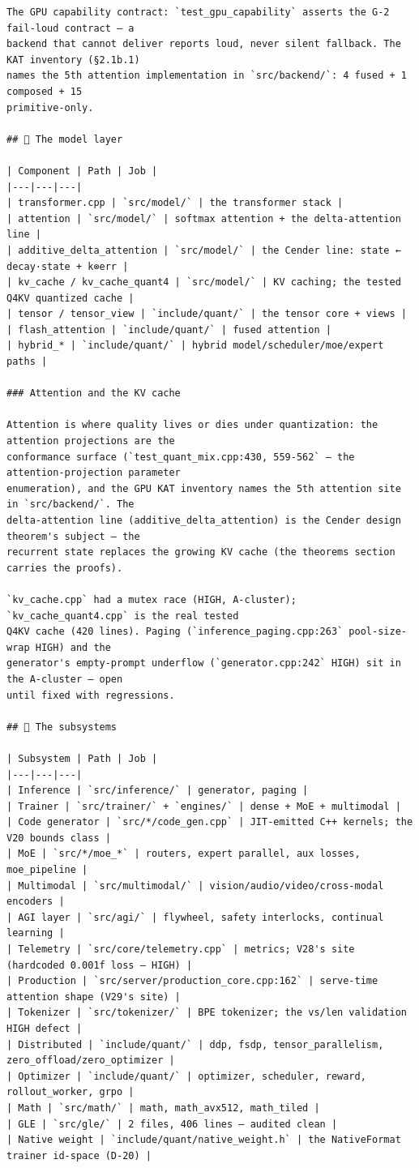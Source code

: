 \begin{Verbatim}[breaklines,breakanywhere,fontsize=\footnotesize]
The GPU capability contract: `test_gpu_capability` asserts the G-2 fail-loud contract — a
backend that cannot deliver reports loud, never silent fallback. The KAT inventory (§2.1b.1)
names the 5th attention implementation in `src/backend/`: 4 fused + 1 composed + 15
primitive-only.

## 🧠 The model layer

| Component | Path | Job |
|---|---|---|
| transformer.cpp | `src/model/` | the transformer stack |
| attention | `src/model/` | softmax attention + the delta-attention line |
| additive_delta_attention | `src/model/` | the Cender line: state ← decay·state + k⊗err |
| kv_cache / kv_cache_quant4 | `src/model/` | KV caching; the tested Q4KV quantized cache |
| tensor / tensor_view | `include/quant/` | the tensor core + views |
| flash_attention | `include/quant/` | fused attention |
| hybrid_* | `include/quant/` | hybrid model/scheduler/moe/expert paths |

### Attention and the KV cache

Attention is where quality lives or dies under quantization: the attention projections are the
conformance surface (`test_quant_mix.cpp:430, 559-562` — the attention-projection parameter
enumeration), and the GPU KAT inventory names the 5th attention site in `src/backend/`. The
delta-attention line (additive_delta_attention) is the Cender design theorem's subject — the
recurrent state replaces the growing KV cache (the theorems section carries the proofs).

`kv_cache.cpp` had a mutex race (HIGH, A-cluster); `kv_cache_quant4.cpp` is the real tested
Q4KV cache (420 lines). Paging (`inference_paging.cpp:263` pool-size-wrap HIGH) and the
generator's empty-prompt underflow (`generator.cpp:242` HIGH) sit in the A-cluster — open
until fixed with regressions.

## 🧩 The subsystems

| Subsystem | Path | Job |
|---|---|---|
| Inference | `src/inference/` | generator, paging |
| Trainer | `src/trainer/` + `engines/` | dense + MoE + multimodal |
| Code generator | `src/*/code_gen.cpp` | JIT-emitted C++ kernels; the V20 bounds class |
| MoE | `src/*/moe_*` | routers, expert parallel, aux losses, moe_pipeline |
| Multimodal | `src/multimodal/` | vision/audio/video/cross-modal encoders |
| AGI layer | `src/agi/` | flywheel, safety interlocks, continual learning |
| Telemetry | `src/core/telemetry.cpp` | metrics; V28's site (hardcoded 0.001f loss — HIGH) |
| Production | `src/server/production_core.cpp:162` | serve-time attention shape (V29's site) |
| Tokenizer | `src/tokenizer/` | BPE tokenizer; the vs/len validation HIGH defect |
| Distributed | `include/quant/` | ddp, fsdp, tensor_parallelism, zero_offload/zero_optimizer |
| Optimizer | `include/quant/` | optimizer, scheduler, reward, rollout_worker, grpo |
| Math | `src/math/` | math, math_avx512, math_tiled |
| GLE | `src/gle/` | 2 files, 406 lines — audited clean |
| Native weight | `include/quant/native_weight.h` | the NativeFormat trainer id-space (D-20) |


\end{Verbatim}
